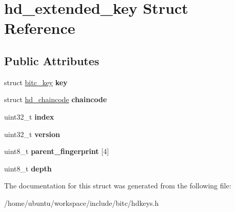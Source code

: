 \hypertarget{structhd__extended__key}{\section{hd\-\_\-extended\-\_\-key Struct Reference}
\label{structhd__extended__key}
}
\subsection*{Public Attributes}
\begin{DoxyCompactItemize}
\item 
\hypertarget{structhd__extended__key_ab7d59ea807a520d8d087c12f9ef30126}{struct \hyperlink{structbitc__key}{bitc\-\_\-key} {\bfseries key}}\label{structhd__extended__key_ab7d59ea807a520d8d087c12f9ef30126}

\item 
\hypertarget{structhd__extended__key_a859dec4ed38e20a43f828fbf1b79094e}{struct \hyperlink{structhd__chaincode}{hd\-\_\-chaincode} {\bfseries chaincode}}\label{structhd__extended__key_a859dec4ed38e20a43f828fbf1b79094e}

\item 
\hypertarget{structhd__extended__key_adfae22312bd519bd21f40aa1a2a9076b}{uint32\-\_\-t {\bfseries index}}\label{structhd__extended__key_adfae22312bd519bd21f40aa1a2a9076b}

\item 
\hypertarget{structhd__extended__key_a69c00a2d280a9cf3ea59d2b9799a7b6b}{uint32\-\_\-t {\bfseries version}}\label{structhd__extended__key_a69c00a2d280a9cf3ea59d2b9799a7b6b}

\item 
\hypertarget{structhd__extended__key_af703b27ec61d6b4285743279b09366af}{uint8\-\_\-t {\bfseries parent\-\_\-fingerprint} \mbox{[}4\mbox{]}}\label{structhd__extended__key_af703b27ec61d6b4285743279b09366af}

\item 
\hypertarget{structhd__extended__key_a77af7cd1b518b4717cb0ef60bff0471e}{uint8\-\_\-t {\bfseries depth}}\label{structhd__extended__key_a77af7cd1b518b4717cb0ef60bff0471e}

\end{DoxyCompactItemize}


The documentation for this struct was generated from the following file\-:\begin{DoxyCompactItemize}
\item 
/home/ubuntu/workspace/include/bitc/hdkeys.\-h\end{DoxyCompactItemize}
